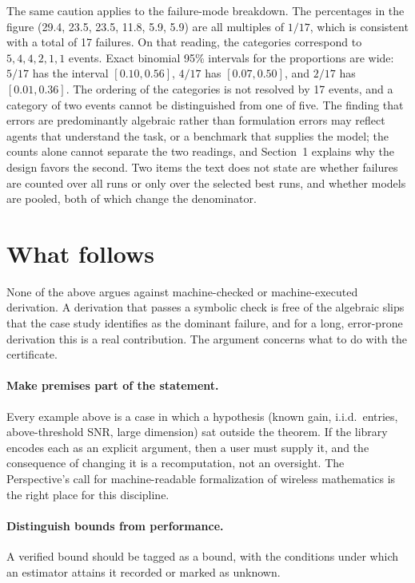 \documentclass[11pt]{article}
\theoremstyle{definition}
\begin{document}
The same caution applies to the failure-mode breakdown. The percentages in the figure (29.4, 23.5, 23.5, 11.8, 5.9, 5.9) are all multiples of $1/17$, which is consistent with a total of 17 failures. On that reading, the categories correspond to $5,4,4,2,1,1$ events. Exact binomial 95\% intervals for the proportions are wide: $5/17$ has the interval $[0.10,0.56]$, $4/17$ has $[0.07,0.50]$, and $2/17$ has $[0.01,0.36]$. The ordering of the categories is not resolved by 17 events, and a category of two events cannot be distinguished from one of five. The finding that errors are predominantly algebraic rather than formulation errors may reflect agents that understand the task, or a benchmark that supplies the model; the counts alone cannot separate the two readings, and Section~1 explains why the design favors the second. Two items the text does not state are whether failures are counted over all runs or only over the selected best runs, and whether models are pooled, both of which change the denominator.

\section{What follows}

None of the above argues against machine-checked or machine-executed derivation. A derivation that passes a symbolic check is free of the algebraic slips that the case study identifies as the dominant failure, and for a long, error-prone derivation this is a real contribution. The argument concerns what to do with the certificate.

\paragraph{Make premises part of the statement.} Every example above is a case in which a hypothesis (known gain, i.i.d.\ entries, above-threshold SNR, large dimension) sat outside the theorem. If the library encodes each as an explicit argument, then a user must supply it, and the consequence of changing it is a recomputation, not an oversight. The Perspective's call for machine-readable formalization of wireless mathematics is the right place for this discipline.

\paragraph{Distinguish bounds from performance.} A verified bound should be tagged as a bound, with the conditions under which an estimator attains it recorded or marked as unknown.
\end{document}
